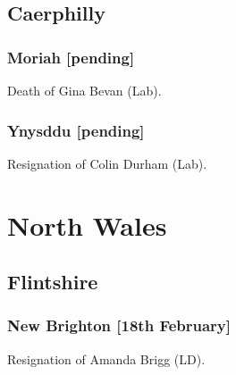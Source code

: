 \documentclass[a4paper,openany]{book}
\begin{document}
\begin{resultsiii}
\subsection*{Caerphilly}

\subsubsection*{Moriah \hspace*{\fill}\nolinebreak[1]%
\enspace\hspace*{\fill}
[pending]}


Death of Gina Bevan (Lab).

\subsubsection*{Ynysddu \hspace*{\fill}\nolinebreak[1]%
\enspace\hspace*{\fill}
[pending]}


Resignation of Colin Durham (Lab).

\section{North Wales}

\subsection*{Flintshire}

\subsubsection*{New Brighton \hspace*{\fill}\nolinebreak[1]%
\enspace\hspace*{\fill}
[18th February]}


Resignation of Amanda Brigg (LD).

\section[Clyde Councils]{}


\end{resultsiii}
\end{document}
